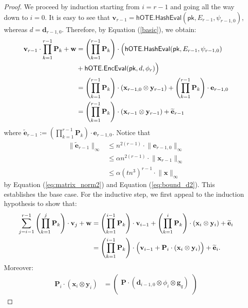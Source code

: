 \documentclass{article}
\newcommand{\BOTE}{\mathsf{hOTE}}
\newcommand{\algofont}[1]{\ensuremath{\mathsf{#1}}}
\newcommand{\Enc}{{\algofont{Enc}}}
\newcommand{\Eval}{\algofont{Eval}\xspace}
\newcommand{\Hash}{{\algofont{Hash}}}
\newcommand{\pk}{{\mathsf{pk}}}
\begin{document}
\begin{proof}
We proceed by induction starting from $i=r-1$ and going all the way down to $i=0$.
It is easy to see that $\mathbf{v}_{r-1}= \BOTE.\Hash\Eval(\pk, E_{r-1}, \psi_{r-1,0})$, whereas $d=\mathbf{d}_{r-1,0}$. Therefore, by Equation (\ref{basic}), we obtain:
\begin{align*}\mathbf{v}_{r-1}\cdot \prod_{k=1}^{r-1} \mathbf{P}_k+\mathbf{w}&=\left(\prod_{k=1}^{r-1} \mathbf{P}_k\right)\cdot \Bigl(\BOTE.\Hash\Eval(\pk, E_{r-1}, \psi_{r-1,0})\\
&+\BOTE.\Enc\Eval(\pk, d, \phi_r)\Bigr)\\
&=\left(\prod_{k=1}^{r-1} \mathbf{P}_k\right)\cdot (\mathbf{x}_{r-1,0}\otimes \mathbf{y}_{r-1})+\left(\prod_{k=1}^{r-1} \mathbf{P}_k\right)\cdot\mathbf{e}_{r-1,0}\\
&=\left(\prod_{k=1}^{r-1} \mathbf{P}_k\right)\cdot(\mathbf{x}_{r-1}\otimes \mathbf{y}_{r-1})+\widetilde{\mathbf{e}}_{r-1}\end{align*}
where $\widetilde{\mathbf{e}}_{r-1}:=\left(\prod_{k=1}^{r-1} \mathbf{P}_k\right)\cdot\mathbf{e}_{r-1,0}$. Notice that 
\begin{align*}\lVert\widetilde{\mathbf{e}}_{r-1}\rVert_\infty&\le n^{2(r-1)}\cdot \lVert \mathbf{e}_{r-1,0}\rVert_\infty\\
&\le \alpha n^{2(r-1)}\cdot \lVert \mathbf{x}_{r-1}\rVert_\infty\\
&\le \alpha (t n^3)^{r-1}\cdot \lVert \mathbf{x}\rVert_\infty\end{align*}
by Equation (\ref{eq:matrix_norm2}) and Equation (\ref{eq:bound_d2}).
This establishes the base case. For the inductive step, we first appeal to the induction hypothesis to show that:
\begin{align*}\sum_{j=i-1}^{r-1}\left(\prod_{k=1}^{j} \mathbf{P}_k\right)\cdot\mathbf{v}_{j}+\mathbf{w}&=\left(\prod_{k=1}^{i-1} \mathbf{P}_k\right)\cdot \mathbf{v}_{i-1}+\left(\prod_{k=1}^{i} \mathbf{P}_k\right)\cdot(\mathbf{x}_{i}\otimes \mathbf{y}_i)+\widetilde{\mathbf{e}}_i\\
&=\left(\prod_{k=1}^{i-1} \mathbf{P}_k\right)\cdot\Bigl(\mathbf{v}_{i-1}+\mathbf{P}_i\cdot(\mathbf{x}_{i}\otimes \mathbf{y}_i)\Bigr)+\widetilde{\mathbf{e}}_i.\end{align*}
 Moreover:
\begin{align*}
\mathbf{P}_i\cdot (\mathbf{x}_i\otimes \mathbf{y}_i)&=\begin{pmatrix} \mathbf{P}\cdot (\mathbf{d}_{i-1,0}\otimes \phi_i\otimes \mathbf{g}_q)\\

\end{pmatrix}
\end{align*}
\end{proof}
\end{document}
